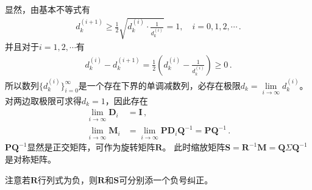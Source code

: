 \begin{prove}
    显然，由基本不等式有
    \begin{align}
        d_k^{(i+1)}\ge\frac{1}{2}\sqrt{d_k^{(i)}\cdot\frac{1}{d_k^{(i)}}}=1,\quad i=0,1,2,\cdots\, .
    \end{align}
    并且对于$i=1,2,\cdots$有
    \begin{align}
        d_k^{(i)}-d_k^{(i+1)}=\frac{1}{2}\left(d_k^{(i)}-\frac{1}{d_k^{(i)}}\right)\ge0\, .
    \end{align}
    所以数列$\{d_k^{(i)}\}_{i=0}^{\infty}$是一个存在下界的单调减数列，必存在极限$d_k=\lim\limits_{i\rightarrow\infty}{d_k^{(i)}}$。
    对两边取极限可求得$d_k=1$，因此存在
    \begin{align}
        \lim\limits_{i\rightarrow\infty}\bm D_i & =\bm I\, ,                                                                  \\
        \lim\limits_{i\rightarrow\infty}\bm M_i & =\lim\limits_{i\rightarrow\infty}\bm P\bm D_i\bm Q^{-1}=\bm P\bm Q^{-1}\, .
    \end{align}
    $\bm P\bm Q^{-1}$显然是正交矩阵，可作为旋转矩阵$\bm R$。
    此时缩放矩阵$\bm S=\bm R^{-1}\bm M=\bm Q\bm \varSigma\bm Q^{-1}$是对称矩阵。

    注意若$\bm R$行列式为负，则$\bm R$和$\bm S$可分别添一个负号纠正。
\end{prove}